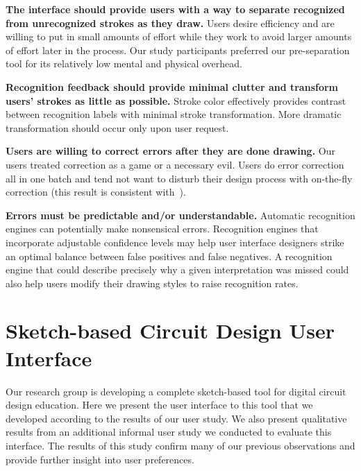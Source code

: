 \documentclass{elsart}
\begin{document}
\textbf{The interface should provide users with a way to separate
recognized from unrecognized strokes as they draw.}  Users desire
efficiency and are willing to put in small amounts of effort while they
work to avoid larger amounts of effort later in the process.  Our
study participants preferred our pre-separation tool for its relatively low
mental and physical overhead.

\textbf{Recognition feedback should provide minimal clutter and
transform users' strokes as little as possible.} Stroke color
effectively provides contrast between recognition labels with minimal
stroke transformation.  More dramatic transformation
should occur only upon user request.

\textbf{Users are willing to correct errors after they are done
drawing.}  Our users treated correction as a game or a necessary evil.
Users do error correction all in one batch and tend not want to
disturb their design process with on-the-fly correction (this result
is consistent with~\cite{Hong2002Sketch}).

\textbf{Errors must be predictable and/or understandable.} Automatic
recognition engines can potentially make nonsensical errors.
Recognition engines that incorporate adjustable confidence levels may
help user interface designers strike an optimal balance between false
positives and false negatives.  A recognition engine that could
describe precisely why a given interpretation was missed could also help 
users modify their drawing styles to raise recognition rates.  


\section{Sketch-based Circuit Design User Interface}
Our research group is developing a complete sketch-based tool for
digital circuit design education.  Here we present the user interface
to this tool that we developed according to the results of our user
study.  We also present qualitative results from an additional informal
user study we conducted to evaluate this interface.  The results of this
study confirm many of our previous observations and provide further
insight into user preferences.
\end{document}
